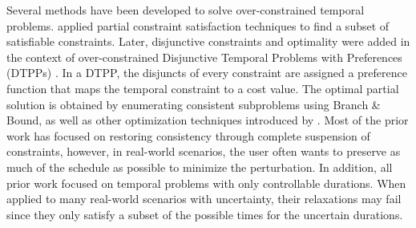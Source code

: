 \documentclass[jair,twoside,11pt,theapa]{article}
\begin{document}
Several methods have been developed to solve over-constrained temporal problems.  applied partial constraint satisfaction techniques to find a subset of satisfiable constraints. Later, disjunctive
constraints and optimality were added in the context of over-constrained
Disjunctive Temporal Problems with Preferences (DTPPs)
\cite{Peintner_Pref_2005}. In a DTPP, the disjuncts of every constraint are
assigned a preference function that maps the temporal constraint to a cost
value. The optimal partial solution is obtained by enumerating consistent
subproblems using Branch \& Bound, as well as other optimization techniques
introduced by . Most of the prior work has
focused on restoring consistency through complete suspension of constraints,
however, in real-world scenarios, the user often wants to preserve as much of
the schedule as possible to minimize the perturbation. In addition, all prior
work focused on temporal problems with only controllable durations. When applied
to many real-world scenarios with uncertainty, their relaxations may fail since
they only satisfy a subset of the possible times for the uncertain durations.


%
%
%
%
%
%
%
\end{document}
